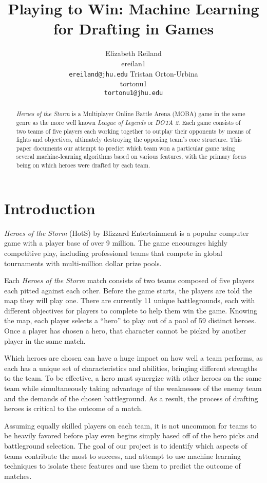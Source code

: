 \documentclass[11pt,letterpaper]{article}
\title{Playing to Win: Machine Learning for Drafting in Games}
\author{Elizabeth Reiland\\
  ereilan1\\
  {\tt ereiland@jhu.edu}
  \And
  Tristan Orton-Urbina \\
  tortonu1 \\
  {\tt tortonu1@jhu.edu}}
\date{}
\begin{document}
\maketitle
\begin{abstract}
\textit{Heroes of the Storm} is a Multiplayer Online Battle Arena (MOBA) game in the same genre as the more well known \textit{League of Legends} or \textit{DOTA 2}. Each game consists of two teams of five players each working together to outplay their opponents by means of fights and objectives, ultimately destroying the opposing team's core structure. This paper documents our attempt to predict which team won a particular game using several machine-learning algorithms based on various features, with the primary focus being on which heroes were drafted by each team.
\end{abstract}

\section{Introduction}
\textit{Heroes of the Storm} (HotS) by Blizzard Entertainment is a popular computer game with a player base of over 9 million. The game encourages highly competitive play, including professional teams that compete in global tournaments with multi-million dollar prize pools.

Each \textit{Heroes of the Storm} match consists of two teams composed of five players each pitted against each other. Before the game starts, the players are told the map they will play one. There are currently 11 unique battlegrounds, each with different objectives for players to complete to help them win the game. Knowing the map, each player selects a ``hero'' to play out of a pool of 59 distinct heroes. Once a player has chosen a hero, that character cannot be picked by another player in the same match. 

Which heroes are chosen can have a huge impact on how well a team performs, as each has a unique set of characteristics and abilities, bringing different strengths to the team. To be effective, a hero must synergize with other heroes on the same team while simultaneously taking advantage of the weaknesses of the enemy team and the demands of the chosen battleground. As a result, the process of drafting heroes is critical to the outcome of a match.

Assuming equally skilled players on each team, it is not uncommon for teams to be heavily favored before play even begins simply based off of the hero picks and battleground selection. The goal of our project is to identify which aspects of teams contribute the most to success, and attempt to use machine learning techniques to isolate these features and use them to predict the outcome of matches.
\end{document}
